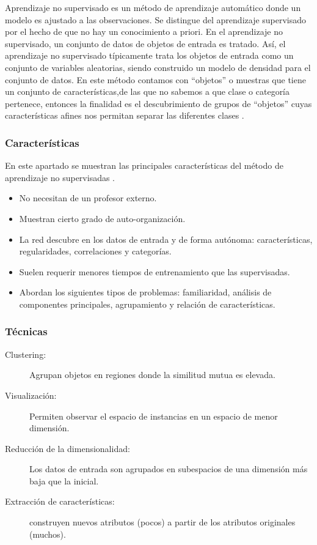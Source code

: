 Aprendizaje no supervisado es un método de aprendizaje automático donde un modelo es ajustado  a  las  observaciones.  Se  distingue  del  aprendizaje  supervisado  por  el  hecho  de  que no hay un conocimiento a priori. En el aprendizaje no supervisado, un conjunto de datos de objetos de entrada es tratado. Así, el aprendizaje no supervisado típicamente trata los objetos de entrada como un conjunto de variables aleatorias, siendo construido un modelo de densidad para el conjunto de datos.
\vskip 1cm
En este método contamos con “objetos” o muestras que tiene un conjunto de características,de las que no sabemos a que clase o categoría pertenece, entonces la finalidad es el descubrimiento de grupos de “objetos” cuyas características afines nos permitan separar las diferentes clases \citep{Araujo}.

\subsubsection{Características}

En este apartado se muestran las principales características del método de aprendizaje no supervisadas \citep{Hinton_Sejnowski}.

\begin{itemize}
\item No necesitan de un profesor externo.
\item Muestran cierto grado de auto-organización.
\item La red descubre en los datos de entrada y de forma autónoma: características, regularidades, correlaciones y categorías.
\item Suelen requerir menores tiempos de entrenamiento que las supervisadas.
\item Abordan los siguientes tipos de problemas: familiaridad, análisis de componentes principales, agrupamiento y relación de características.
\end{itemize}

\subsubsection{Técnicas}

\begin{description}
	\item[Clustering:] Agrupan objetos en regiones donde la similitud mutua es elevada.
	\item[Visualización:] Permiten observar el espacio de instancias en un espacio de menor dimensión.
	\item[Reducción de la dimensionalidad:] Los datos de entrada son agrupados en subespacios de una dimensión más baja que la inicial.
	\item[Extracción de características:] construyen nuevos atributos (pocos) a partir de los atributos originales (muchos).
\end{description}


